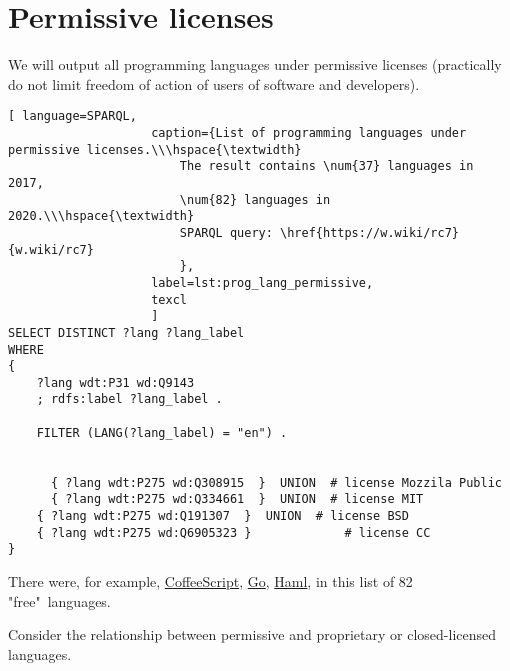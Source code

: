 \section{Permissive licenses}
We will output all programming languages under permissive licenses (practically do not limit freedom of action of users of software and developers).

\begin{lstlisting}[ language=SPARQL, 
                    caption={List of programming languages under permissive licenses.\\\hspace{\textwidth}
                        The result contains \num{37} languages in 2017, 
                        \num{82} languages in 2020.\\\hspace{\textwidth}
                        SPARQL query: \href{https://w.wiki/rc7}{w.wiki/rc7}
                        },
                    label=lst:prog_lang_permissive,
                    texcl 
                    ]
SELECT DISTINCT ?lang ?lang_label
WHERE
{
    ?lang wdt:P31 wd:Q9143
    ; rdfs:label ?lang_label . 

    FILTER (LANG(?lang_label) = "en") . 

     
      { ?lang wdt:P275 wd:Q308915  }  UNION  # license Mozzila Public
      { ?lang wdt:P275 wd:Q334661  }  UNION  # license MIT
	{ ?lang wdt:P275 wd:Q191307  }  UNION  # license BSD
	{ ?lang wdt:P275 wd:Q6905323 }             # license CC
}
\end{lstlisting}%

There were, for example, \href{https://en.wikipedia.org/wiki/CoffeeScript}{CoffeeScript}, \href{https://en.wikipedia.org/wiki/Go}{Go}, \href{https://en.wikipedia.org/wiki/Haml}{Haml}, in this list of 82 "free"\  languages.

Consider the relationship between permissive and proprietary or closed-licensed languages.

